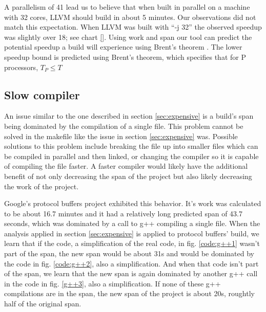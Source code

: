 \documentclass[sigconf,10pt,review,authorversion]{acmart}\settopmatter{printfolios=true,printccs=false,printacmref=false}
\begin{document}
A parallelism of 41 lead us to believe that when built in parallel on a machine with 32 cores,
LLVM should build in about 5 minutes.  Our observations did not match this expectation.  When LLVM was
built with ``-j 32'' the observed speedup was slightly over 18; see chart \ref{}.  Using work and
span our tool can predict the potential speedup a build will experience using Brent's theorem
\cite{}.  The lower speedup bound is predicted using Brent's theorem, which specifies that for
P processors, \begin{math} T_P \leq T \end{math}



\subsection{Slow compiler}
\label{sec:compiler}

An issue similar to the one described in section \ref{sec:expensive} is a build's
span being dominated by the compilation of a single file.  This problem cannot be
solved in the makefile like the issue in section \ref{sec:expensive} was.
Possible solutions to this problem include
breaking the file up into smaller files which can be compiled in parallel and then
linked, or changing the compiler so it is capable of compiling the file faster.
A faster compiler would likely have the additional benefit of not only decreasing the span
of the project but also likely decreasing the work of the project.

Google's protocol buffers project \cite{protobufs3.6.1} exhibited this behavior.  It's work was calculated
to be about 16.7 minutes and it had a relatively
long predicted span of 43.7 seconds, which was dominated by a call to g++ compiling
a single file.  When the analysis applied in section \ref{sec:expensive} is applied to
protocol buffers' build, we learn that if the code, a simplification of the real code,
in fig. \ref{code:g++1} wasn't part of the span,
the new span would be about 31s and would be dominated by the code in fig. \ref{code:g++2}, also
a simplification.
And when that
code isn't part of the span, we learn that the new span is again dominated by another
g++ call in the code in fig. \ref{g++3}, also a simplification.
If none of these g++ compilations are in the span,
the new span of the project is about 20s, roughtly half of the original span.
\end{document}
